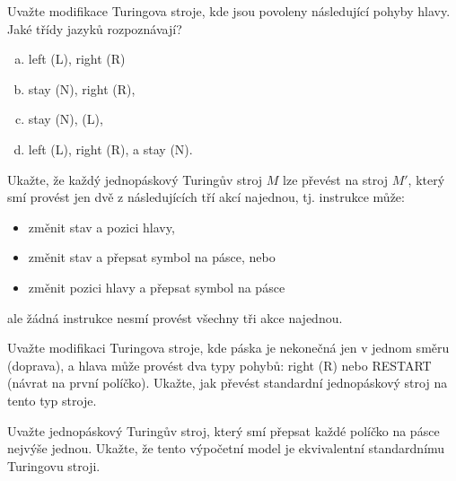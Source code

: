 \documentclass[a4paper,12pt]{amsart}
\begin{document}
\begin{problem}
    
    Uvažte modifikace Turingova stroje, kde jsou povoleny následující pohyby hlavy. Jaké třídy jazyků rozpoznávají?
    \begin{multicols}{2}
        \begin{enumerate}[(a)]
            \item left (L), right (R)
            \item stay (N), right (R),
            \item stay (N), (L),
            \item left (L), right (R), a stay (N).
        \end{enumerate}    
    \end{multicols}

\end{problem}


\begin{problem}

    Ukažte, že každý jednopáskový Turingův stroj $M$ lze převést na stroj $M'$, který smí provést jen dvě z následujících tří akcí najednou, tj. instrukce může: 
    \begin{itemize}
        \item změnit stav a pozici hlavy,
        \item změnit stav a přepsat symbol na pásce, nebo
        \item změnit pozici hlavy a přepsat symbol na pásce
    \end{itemize}
    ale žádná instrukce nesmí provést všechny tři akce najednou.

\end{problem}


\begin{problem}
    Uvažte modifikaci Turingova stroje, kde páska je nekonečná jen v jednom směru (doprava), a hlava může provést dva typy pohybů: right (R) nebo RESTART (návrat na první políčko). Ukažte, jak převést standardní jednopáskový stroj na tento typ stroje.
\end{problem}
        

\begin{problem}

    Uvažte jednopáskový Turingův stroj, který smí přepsat každé políčko na pásce nejvýše jednou. Ukažte, že tento výpočetní model je ekvivalentní standardnímu Turingovu stroji.

\end{problem}
    
\end{document}
